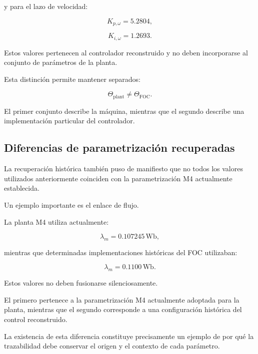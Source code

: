 y para el lazo de velocidad:

\begin{equation}
K_{p,\omega}=5.2804,
\end{equation}

\begin{equation}
K_{i,\omega}=1.2693.
\end{equation}

Estos valores pertenecen al controlador reconstruido y no deben incorporarse al conjunto de parámetros de la planta.

Esta distinción permite mantener separados:

\begin{equation}
\Theta_{\mathrm{plant}}
\neq
\Theta_{\mathrm{FOC}}.
\end{equation}

El primer conjunto describe la máquina, mientras que el segundo describe una implementación particular del controlador.

\subsection{Diferencias de parametrización recuperadas}

La recuperación histórica también puso de manifiesto que no todos los valores utilizados anteriormente coinciden con la parametrización M4 actualmente establecida.

Un ejemplo importante es el enlace de flujo.

La planta M4 utiliza actualmente:

\begin{equation}
\lambda_m=0.107245\,\mathrm{Wb},
\end{equation}

mientras que determinadas implementaciones históricas del FOC utilizaban:

\begin{equation}
\lambda_m=0.1100\,\mathrm{Wb}.
\end{equation}

Estos valores no deben fusionarse silenciosamente.

El primero pertenece a la parametrización M4 actualmente adoptada para la planta, mientras que el segundo corresponde a una configuración histórica del control reconstruido.

La existencia de esta diferencia constituye precisamente un ejemplo de por qué la trazabilidad debe conservar el origen y el contexto de cada parámetro.

